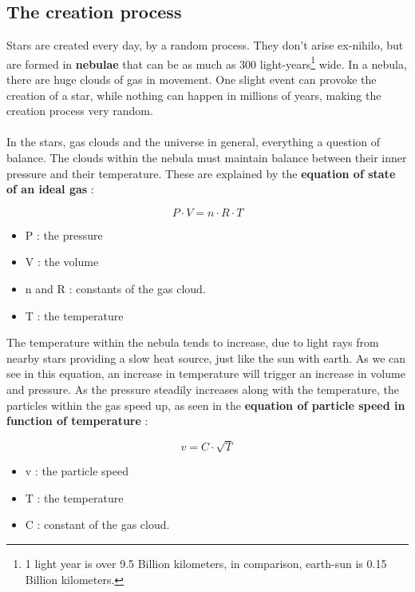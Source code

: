 \documentclass[a4paper, 11pt]{article} %
\begin{document}
\subsection{The creation process}
Stars are created every day, by a random process. They don't arise ex-nihilo, but are formed in \textbf{nebulae} that can be as much as 300 light-years\footnote{ 1 light year is over 9.5 Billion kilometers, in comparison, earth-sun is 0.15 Billion kilometers.} wide. In a nebula, there are huge clouds of gas in movement. One slight event can provoke the creation of a star, while nothing can happen in millions of years, making the creation process very random.

\paragraph*{}
In the stars, gas clouds and the universe in general, everything  a question of balance. The clouds within the nebula must maintain balance between their inner pressure and their temperature. These are explained by the \textbf{equation of state of an ideal gas} : 

\begin{multicols}{2}

\begin{equation}
P\cdot V = n \cdot R \cdot T
\end{equation}
\vspace{2cm}
\begin{itemize}
\item P : the pressure
\item V : the volume
\item n and R : constants of the gas cloud.
\item T : the temperature 
\end{itemize}
\end{multicols}

The temperature within the nebula tends to increase, due to light rays from nearby stars providing a slow heat source, just like the sun with earth. As we can see in this equation, an increase in temperature will trigger an increase in volume and pressure. As the pressure steadily increases along with the temperature, the particles within the gas speed up, as seen in the \textbf{equation of particle speed in function of temperature} :

\begin{multicols}{2}

\begin{equation}
v = C \cdot \sqrt{T}
\end{equation}
\vspace{2cm}
\begin{itemize}
\item v : the particle speed
\item T : the temperature
\item C : constant of the gas cloud. 
\end{itemize}
\end{multicols}
\end{document}
